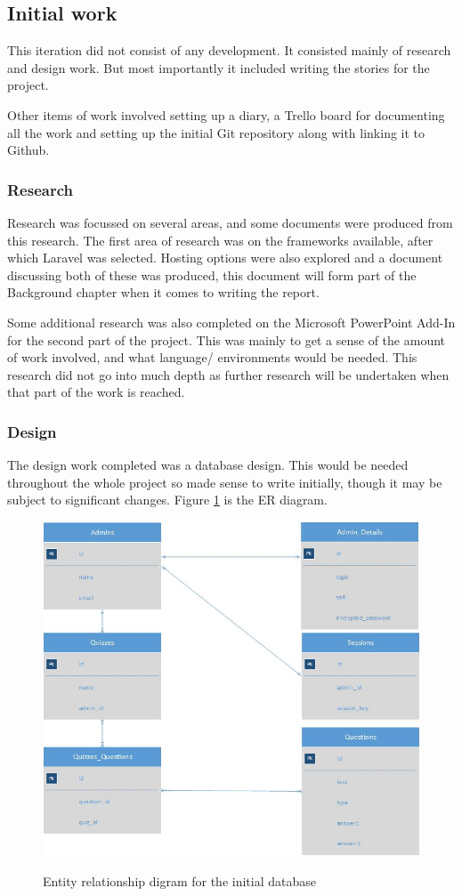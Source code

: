 \subsection{Initial work}
This iteration did not consist of any development. It consisted mainly of research and design work. But most importantly it included writing the stories for the project. 

Other items of work involved setting up a diary, a Trello board for documenting all the work and setting up the initial Git repository along with linking it to Github.
\subsubsection{Research}
Research was focussed on several areas, and some documents were produced from this research. The first area of research was on the frameworks available, after which Laravel was selected. Hosting options were also explored and a document discussing both of these was produced, this document will form part of the Background chapter when it comes to writing the report.

Some additional research was also completed on the Microsoft PowerPoint Add-In for the second part of the project. This was mainly to get a sense of the amount of work involved, and what language/ environments would be needed. This research did not go into much depth as further research will be undertaken when that part of the work is reached.
\subsubsection{Design}
The design work completed was a database design. This would be needed throughout the whole project so made sense to write initially, though it may be subject to significant changes. Figure \ref{fig:initial-er-diagram} is the ER diagram.

\begin{figure}
	\caption{Entity relationship digram for the initial database}
	\includegraphics[width=\textwidth]{Chapter2/Iter-0/Initial-ERDiagram}
	\label{fig:initial-er-diagram}
\end{figure}

